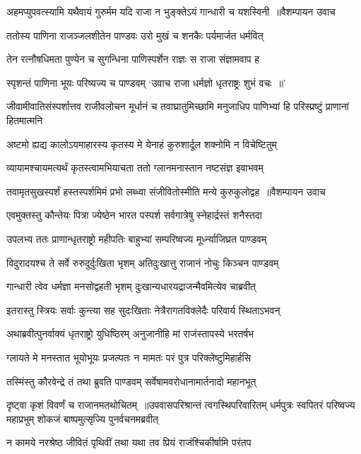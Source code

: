 \threelineshloka
{अहमप्युपवत्स्यामि यथैवायं गुरुर्मम}
{यदि राजा न भुङ्क्तेऽयं गान्धारी च यशस्विनी ॥वैशम्पायन उवाच}
{}


\twolineshloka
{ततोस्य पाणिना राजञ्जलशीतेन पाण्डवः}
{उरो मुखं च शनकैः पर्यमार्जत धर्मवित्}


\twolineshloka
{तेन रत्नौषधिमता पुण्येन च सुगन्धिना}
{पाणिस्पर्शेन राज्ञः स राजा संज्ञामवाप ह}


\twolineshloka
{स्पृशन्तं पाणिना भूयः परिष्यज्य च पाण्डवम्}
{`उवाच राजा धर्मज्ञो धृतराष्ट्रः शुभं वचः ॥'}


\threelineshloka
{जीवामीवातिसंस्पर्शात्तव राजीवलोचन}
{मूर्धानं च तवाघ्रातुमिच्छामि मनुजाधिप}
{पाणिभ्यां हि परिस्प्रष्टुं प्राणानां हितमात्मनि}


\twolineshloka
{अष्टमो ह्यद्य कालोऽयमाहारस्य कृतस्य मे}
{येनाहं कुरुशार्दूल शक्नोमि न विचेष्टितुम्}


\twolineshloka
{व्यायामश्चायमत्यर्थं कृतस्त्वामभियाचता}
{ततो ग्लानमनास्तान नष्टसंज्ञ इवाभवम्}


\threelineshloka
{तवामृतसुखस्पर्शं हस्तस्पर्शमिमं प्रभो}
{लब्ध्वा संजीवितोस्मीति मन्ये कुरुकुलोद्वह ॥वैशम्पायन उवाच}
{}


\twolineshloka
{एवमुक्तस्तु कौन्तेयः पित्रा ज्येष्ठेन भारत}
{पस्पर्श सर्वगात्रेषु स्नेहार्द्रस्तं शनैस्तदा}


\twolineshloka
{उपलभ्य ततः प्राणान्धृतराष्ट्रो महीपतिः}
{बाहुभ्यां सम्परिष्वज्य मूर्ध्न्याजिघ्रत पाण्डवम्}


\twolineshloka
{विदुरादयश्च ते सर्वे रुरुदुर्दुःखिता भृशम्}
{अतिदुःखात्तु राजानं नोचुः किञ्चन पाण्डवम्}


\twolineshloka
{गान्धारी त्वेव धर्मज्ञा मनसोद्वहती भृशम्}
{दुःखान्यधारयद्राजन्मैवमित्येव चाब्रवीत्}


\twolineshloka
{इतरास्तु स्त्रियः सर्वाः कुन्त्या सह सुदःखिताः}
{नेत्रैरागतविक्लेदैः परिवार्य स्थिताऽभवन्}


\twolineshloka
{अथाब्रवीत्पुनर्वाक्यं धृतराष्ट्रो युधिष्ठिरम्}
{अनुजानीहि मां राजंस्तापस्ये भरतर्षभ}


\twolineshloka
{ग्लायते मे मनस्तात भूयोभूयः प्रजल्पतः}
{न मामतः परं पुत्र परिक्लेष्टुमिहार्हसि}


\twolineshloka
{तस्मिंस्तु कौरवेन्द्रे तं तथा ब्रुवति पाण्डवम्}
{सर्वेषामवरोधानामार्तनादो महानभूत्}


दृष्ट्वा कृशं विवर्णं च राजानमतथोचितम् ॥उपवासपरिश्रान्तं त्वगस्थिपरिवारितम्
\twolineshloka
{धर्मपुत्रः स्वपितरं परिष्वज्य महाप्रभुम्}
{शोकजं बाष्पमुत्सृज्यि पुनर्वचनमब्रवीत्}


\twolineshloka
{न कामये नरश्रेष्ठ जीवितं पृथिवीं तथा}
{यथा तव प्रियं राजंश्चिकीर्षामि परंतप}


